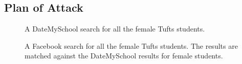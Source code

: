 \subsection{Plan of Attack}
\label{sec:intro_plan_of_attack}

\begin{figure}[hbtp]
  \caption{
    A DateMySchool search for all the female Tufts students.
  }
  \label{fig:fb}
\end{figure}

\begin{figure}[hbtp]
  \caption{
    A Facebook search for all the female Tufts students. The results are
    matched against the DateMySchool results for female students.
  }
  \label{fig:fb}
\end{figure}

